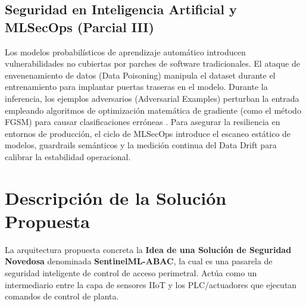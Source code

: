 \documentclass[12pt,letterpaper]{article}
\begin{document}
\subsection{Seguridad en Inteligencia Artificial y MLSecOps (Parcial III)}
Los modelos probabilísticos de aprendizaje automático introducen vulnerabilidades no cubiertas por parches de software tradicionales. El ataque de envenenamiento de datos (Data Poisoning) manipula el dataset durante el entrenamiento para implantar puertas traseras en el modelo. Durante la inferencia, los ejemplos adversarios (Adversarial Examples) perturban la entrada empleando algoritmos de optimización matemática de gradiente (como el método FGSM) para causar clasificaciones erróneas \cite{goodfellow2014}. Para asegurar la resiliencia en entornos de producción, el ciclo de MLSecOps introduce el escaneo estático de modelos, guardrails semánticos y la medición continua del Data Drift para calibrar la estabilidad operacional.

\section{Descripción de la Solución Propuesta}

La arquitectura propuesta concreta la \textbf{Idea de una Solución de Seguridad Novedosa} denominada \textbf{SentinelML-ABAC}, la cual es una pasarela de seguridad inteligente de control de acceso perimetral. Actúa como un intermediario entre la capa de sensores IIoT y los PLC/actuadores que ejecutan comandos de control de planta.
\end{document}
